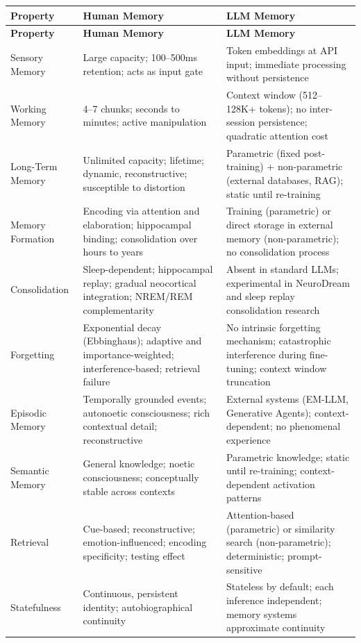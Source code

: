 \begin{longtable}{L{3.5cm}L{4.5cm}L{5cm}}
\toprule
\textbf{Property} & \textbf{Human Memory} & \textbf{LLM Memory} \\
\midrule
\endfirsthead
\toprule
\textbf{Property} & \textbf{Human Memory} & \textbf{LLM Memory} \\
\midrule
\endhead
Sensory Memory & Large capacity; 100--500ms retention; acts as input gate & Token embeddings at API input; immediate processing without persistence \\
\midrule
Working Memory & 4--7 chunks; seconds to minutes; active manipulation & Context window (512--128K+ tokens); no inter-session persistence; quadratic attention cost \\
\midrule
Long-Term Memory & Unlimited capacity; lifetime; dynamic, reconstructive; susceptible to distortion & Parametric (fixed post-training) + non-parametric (external databases, RAG); static until re-training \\
\midrule
Memory Formation & Encoding via attention and elaboration; hippocampal binding; consolidation over hours to years & Training (parametric) or direct storage in external memory (non-parametric); no consolidation process \\
\midrule
Consolidation & Sleep-dependent; hippocampal replay; gradual neocortical integration; NREM/REM complementarity & Absent in standard LLMs; experimental in NeuroDream and sleep replay consolidation research \\
\midrule
Forgetting & Exponential decay (Ebbinghaus); adaptive and importance-weighted; interference-based; retrieval failure & No intrinsic forgetting mechanism; catastrophic interference during fine-tuning; context window truncation \\
\midrule
Episodic Memory & Temporally grounded events; autonoetic consciousness; rich contextual detail; reconstructive & External systems (EM-LLM, Generative Agents); context-dependent; no phenomenal experience \\
\midrule
Semantic Memory & General knowledge; noetic consciousness; conceptually stable across contexts & Parametric knowledge; static until re-training; context-dependent activation patterns \\
\midrule
Retrieval & Cue-based; reconstructive; emotion-influenced; encoding specificity; testing effect & Attention-based (parametric) or similarity search (non-parametric); deterministic; prompt-sensitive \\
\midrule
Statefulness & Continuous, persistent identity; autobiographical continuity & Stateless by default; each inference independent; memory systems approximate continuity \\

\end{longtable}
